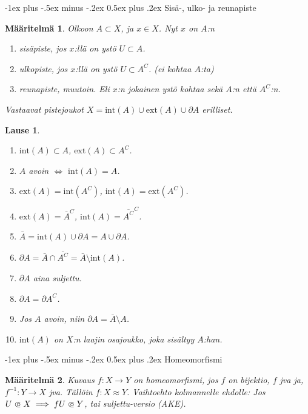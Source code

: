 \documentclass[landscape,a4paper,10pt]{article}
\makeatletter
\renewcommand{\section}{\@startsection{section}{1}{0mm}%
                                {-1ex plus -.5ex minus -.2ex}%
                                {0.5ex plus .2ex}%
                                {\color{blue}\normalfont\large\bfseries}}
\newcommand\opn{\mathrel{\ooalign{$\subset$\cr
  \hidewidth\hbox{$\circ\mkern.5mu$}\cr}}}
\theoremstyle{customtheoremstyle}
\newtheorem*{theorem}{Lause}
\newtheorem*{definition}{Määritelmä}
\makeatother
\begin{document}
\begin{multicols*}{3}
\section{Sisä-, ulko- ja reunapiste}
\begin{definition}
  Olkoon $A \subset X$, ja $x \in X$. Nyt $x$ on $A$:n
  \begin{enumerate}
    \item{sisäpiste, jos $x$:llä on ystö $U \subset A$.}
    \item{ulkopiste, jos $x$:llä on ystö $U \subset A^C$. (ei kohtaa $A$:ta)}
    \item{reunapiste, muutoin. Eli $x$:n jokainen ystö kohtaa sekä $A$:n että
      $A^C$:n.}
  \end{enumerate}
  Vastaavat pistejoukot $X = \text{int}(A) \cup \text{ext}(A) \cup \partial A$
  erilliset.
\end{definition}


\begin{theorem}
  \begin{enumerate}
    \item{$\text{int}(A) \subset A$, $\text{ext}(A) \subset A^C$.}
    \item{$A$ avoin $\iff$ $\text{int}(A) = A$.}
    \item{$\text{ext}(A) = \text{int}(A^C)$, $\text{int}(A) = \text{ext}(A^C)$.}
    \item{$\text{ext}(A) = \bar{A}^C$,
      $\text{int}(A) = \overline{A^C}^C$.}
    \item{$\bar{A} = \text{int}(A) \cup \partial A = A \cup \partial A$.}
    \item{$\partial A = \bar{A} \cap \overline{A^C} =
      \bar{A} \setminus \text{int}(A)$.}
    \item{$\partial A$ aina suljettu.}
    \item{$\partial A = \partial A^C$.}
    \item{Jos $A$ avoin, niin $\partial A = \bar{A} \setminus A$.}
    \item{$\text{int}(A)$ on $X$:n laajin osajoukko, joka sisältyy $A$:han.}
  \end{enumerate}
\end{theorem}


\section{Homeomorfismi}
\begin{definition}
  Kuvaus $f: X \rightarrow Y$ on homeomorfismi, jos $f$ on bijektio, $f$ jva
  ja, $f^{-1}: Y \rightarrow X$ jva. Tällöin $f: X \approx Y$.
  Vaihtoehto kolmannelle ehdolle: Jos $U \opn X \implies f U \opn Y$, tai
  suljettu-versio (AKE).
\end{definition}


\end{multicols*}
\end{document}
